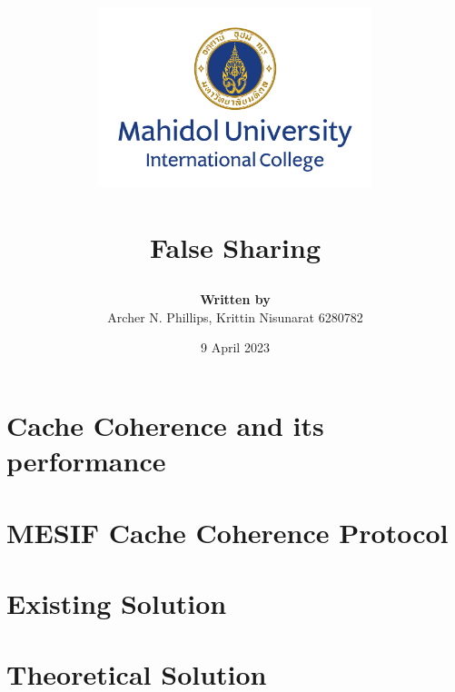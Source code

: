 \documentclass[a4paper, 12pt]{report}
\title{

	{\includegraphics[width=80mm,scale=0.5]{MUIC_Logo_Eng_Center.png}} \\
	{\textbf{\mySubject}}\\
	{\large False Sharing}\\
}
\author{
	{\textbf{Written by}} \\ 
	{Archer N. Phillips, Krittin Nisunarat 6280782} \\
}
\date{9 April 2023}
\begin{document}
\maketitle
\begin{abstract}
	
\end{abstract}
\tableofcontents

\chapter{Cache Coherence and its performance}


\chapter{MESIF Cache Coherence Protocol}


\chapter{Existing Solution}



\chapter{Theoretical Solution}






\end{document}
